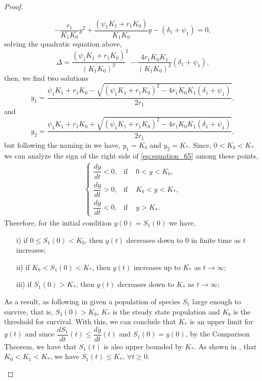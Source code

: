 \documentclass[10pt,letterpaper]{article}
\begin{document}
\begin{proof}
\begin{itemize}
\begin{equation}
-\dfrac{r_1}{K_1K_0}y^2 + \dfrac{(\psi_1K_1+r_1K_0)}{K_1K_0}y-(\delta_1+\psi_1) = 0,    
\end{equation}
solving the quadratic equation above,
\begin{equation}\label{eq:equation_69}
    \Delta = \dfrac{(\psi_1K_1+r_1K_0)}{(K_1K_0)^2}^2 - \dfrac{4r_1K_0K_1}{(K_1K_0)^2}(\delta_1+\psi_1),
\end{equation}
then, we find two solutions 
\begin{equation}\label{eq:equation_70}
     y_1 =\dfrac{\psi_1K_1+r_1K_0 - \sqrt{(\psi_1K_1+r_1K_0)^2 -4r_1K_0K_1(\delta_1+\psi_1)}}{2r_1},
\end{equation} and
\begin{equation}\label{eq:equation_71}
    y_2 = \dfrac{\psi_1K_1+r_1K_0 + \sqrt{(\psi_1K_1+r_1K_0)^2 -4r_1K_0K_1(\delta_1+\psi_1)}}{2r_1},
\end{equation} but following the naming in \cite{Campo2017} we have, $y_1 = K_b$ and $y_2 = K_*$. Since, $0<K_b<K_*$ we can analyze the sign of the right side of \eqref{eq:equation_65} among these points,
\begin{eqnarray}\label{eq:equation_72}
    \left \{ \begin{matrix} \dfrac{dy}{dt}<0, & \mbox{if }& 0<y<K_b, \\ \dfrac{dy}{dt}>0, & \mbox{if }&K_b<y<K_*, \\ \dfrac{dy}{dt}<0, & \mbox{if }&y>K_*. \end{matrix} \right. 
\end{eqnarray}Therefore, for the initial condition $y(0) = S_1(0)$ we have,
\begin{itemize}
    \item[i)] if $0\leq S_1(0) < K_b$, then $y(t)$ decreases down to $0$ in finite time as $t$ increases;
    \item[ii)] if $K_b<S_1(0)<K_*$, then $y(t)$ increases up to $K_*$ as $t \to \infty$;
    \item[iii)] if $S_1(0)>K_*$, then $y(t)$ decreases down to $K_*$ as $t \to \infty$;
\end{itemize} 
As a result, as following in \cite{Campo2017} given a population of species $S_1$ large enough to survive, that is, $S_1(0) > K_b$, $K_*$ is the steady state population and $K_b$ is the threshold for survival. With this, we can conclude that $K_*$ is an upper limit for $y(t)$ and since $\dfrac{dS_1}{dt}(t) \leq \dfrac{dy}{dt}(t)$ and $S_1(0) = y(0)$, by the Comparison Theorem, we have that $S_1(t)$ is also upper bounded by $K_*$. As shown in \cite{Campo2017}, that $K_0 < K_1 < K_*$, we have $S_1(t) \leq K_*$, $\forall t \geq 0$.
\end{itemize}
\end{proof}
\end{document}
